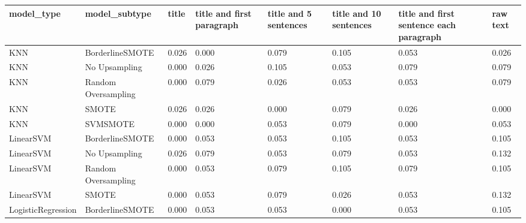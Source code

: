\begin{tabular}{llllllll}
\toprule
                  model\_type &       model\_subtype & title & title and first paragraph & title and 5 sentences & title and 10 sentences & title and first sentence each paragraph &  raw text \\
\midrule
                         KNN &     BorderlineSMOTE & 0.026 &                     0.000 &                 0.079 &                  0.105 &                                   0.053 &     0.026 \\
                         KNN &       No Upsampling & 0.000 &                     0.026 &                 0.105 &                  0.053 &                                   0.079 &     0.079 \\
                         KNN & Random Oversampling & 0.000 &                     0.079 &                 0.026 &                  0.053 &                                   0.053 &     0.079 \\
                         KNN &               SMOTE & 0.026 &                     0.026 &                 0.000 &                  0.079 &                                   0.026 &     0.000 \\
                         KNN &            SVMSMOTE & 0.000 &                     0.000 &                 0.053 &                  0.079 &                                   0.000 &     0.053 \\
                   LinearSVM &     BorderlineSMOTE & 0.000 &                     0.053 &                 0.053 &                  0.105 &                                   0.053 &     0.105 \\
                   LinearSVM &       No Upsampling & 0.026 &                     0.079 &                 0.053 &                  0.079 &                                   0.053 &     0.132 \\
                   LinearSVM & Random Oversampling & 0.000 &                     0.053 &                 0.079 &                  0.105 &                                   0.079 &     0.105 \\
                   LinearSVM &               SMOTE & 0.000 &                     0.053 &                 0.079 &                  0.026 &                                   0.053 &     0.132 \\
          LogisticRegression &     BorderlineSMOTE & 0.000 &                     0.053 &                 0.053 &                  0.000 &                                   0.053 &     0.105 \\

\end{tabular}
